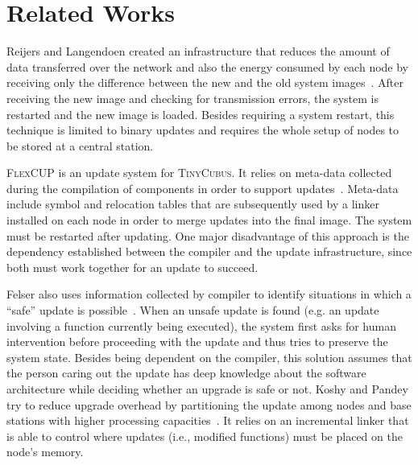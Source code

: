 \documentclass[10pt]{sigplanconf}
\begin{document}

\section{Related Works}

Reijers and Langendoen created an infrastructure that reduces the
amount of data transferred over the network and also the energy
consumed by each node by receiving only the difference between the new
and the old system images~\cite{reijers03efficient}. After receiving
the new image and checking for transmission errors, the system is
restarted and the new image is loaded. Besides requiring a system
restart, this technique is limited to binary updates and requires the
whole setup of nodes to be stored at a central station. %

\textsc{FlexCUP} is an update system for \textsc{TinyCubus}. It relies
on meta-data collected during the compilation of components in order
to support updates~\cite{flexcup}. Meta-data include symbol and
relocation tables that are subsequently used by a linker installed on
each node in order to merge updates into the final image.  The system
must be restarted after updating. One major disadvantage of this
approach is the dependency established between the compiler and the
update infrastructure, since both must work together for an update to
succeed. 

Felser also uses information collected by compiler to identify
situations in which a ``safe'' update is possible~\cite{update}.  When
an unsafe update is found (e.g. an update involving a function
currently being executed), the system first asks for human
intervention before proceeding with the update and thus tries to
preserve the system state.  Besides being dependent on the compiler,
this solution assumes that the person caring out the update has
deep knowledge about the software architecture while deciding whether
an upgrade is safe or not. Koshy and Pandey try to reduce upgrade overhead by partitioning the
update among nodes and base stations with higher processing
capacities~\cite{koshy}. It relies on an incremental linker that is
able to control where updates (i.e., modified functions) must be
placed on the node's memory. %
\end{document}
